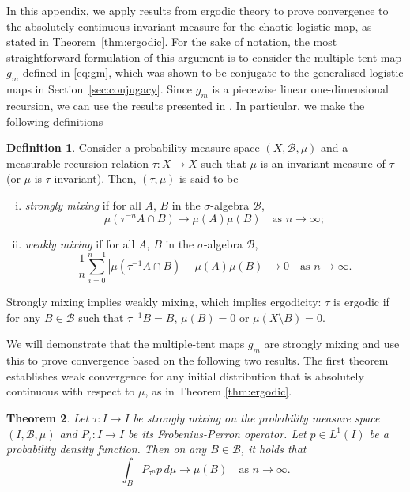 \documentclass[a4paper]{article}
\newtheorem{theorem}{Theorem}%
\theoremstyle{definition}
\newtheorem{definition}[theorem]{Definition}
\numberwithin{equation}{section}
\numberwithin{theorem}{section}
\begin{document}
{In this appendix, we apply results from ergodic theory to prove convergence to the absolutely continuous invariant measure for the chaotic logistic map, as stated in Theorem~\ref{thm:ergodic}. For the sake of notation, the most straightforward formulation of this argument is to consider the multiple-tent map $g_m$ defined in \eqref{eq:gm}, which was shown to be conjugate to the generalised logistic maps in Section~\ref{sec:conjugacy}. Since $g_m$ is a piecewise linear one-dimensional recursion, we can use the results presented in \cite{boyarsky1997laws}. In particular, we make the following definitions
\begin{definition} \label{def:mixing}
    Consider a probability measure space $(X,\mathcal{B},\mu)$ and a measurable recursion relation $\tau:X\rightarrow X$ such that $\mu$ is an invariant measure of $\tau$ (or $\mu$ is $\tau$-invariant). Then, $(\tau, \mu)$ is said to be
    \begin{enumerate}[(i)]
    \item \emph{strongly mixing} if for all $A$, $B$ in the $\sigma$-algebra $\mathcal{B}$,
    \begin{equation}
        \mu(\tau^{-n}A\cap B) \rightarrow \mu(A)\mu(B)\quad\text{as }n\rightarrow \infty;
    \end{equation}
    \item \emph{weakly mixing} if for all $A$, $B$ in the $\sigma$-algebra $\mathcal{B}$,
    \begin{equation}
        \frac{1}{n}\sum_{i=0}^{n-1}|\mu(\tau^{-1}A\cap B) - \mu(A)\mu(B)| \rightarrow 0 \quad\text{as } n \rightarrow \infty.
    \end{equation}
    \end{enumerate}
\end{definition}

Strongly mixing implies weakly mixing, which implies ergodicity: $\tau$ is ergodic if for any $B\in\mathcal{B}$ such that $\tau^{-1}B=B$, $\mu(B)=0$ or $\mu(X\setminus B)=0$.

We will demonstrate that the multiple-tent maps $g_m$ are strongly mixing and use this to prove convergence based on the following two results. The first theorem establishes weak convergence for any initial distribution that is absolutely continuous with respect to $\mu$, as in Theorem \ref{thm:ergodic}.

\begin{theorem} \label{thm:weak_convergence} \cite[Proposition~4.2.12]{boyarsky1997laws}
    Let $\tau:I\rightarrow I$ be strongly mixing on the probability measure space $(I,\mathcal{B}, \mu)$ and $P_\tau:I\rightarrow I$ be its Frobenius-Perron operator. Let $p\in L^1(I)$ be a probability density function. Then on any $B\in\mathcal{B}$, it holds that
    \begin{equation*}
        \int_B P_{\tau^n} p\,d\mu \rightarrow \mu(B)\quad\text{as $n\rightarrow\infty$.}
    \end{equation*}
\end{theorem}

}
\end{document}
